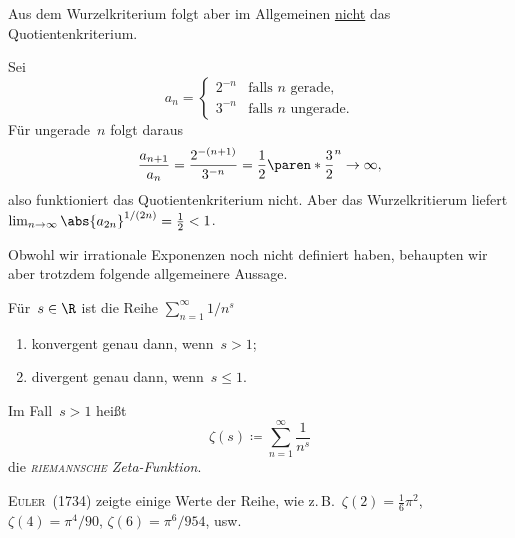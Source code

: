 \documentclass[a4paper]{article}
\begin{document}
Aus dem Wurzelkriterium folgt aber im Allgemeinen \underline{nicht} das Quotientenkriterium.

\begin{example}
    Sei
    \begin{equation*}
        a_n = \begin{cases}
            2^{-n} & \text{falls $n$ gerade},   \\
            3^{-n} & \text{falls $n$ ungerade}.
        \end{cases}
    \end{equation*}
    Für ungerade~$n$ folgt daraus
    \begin{equation*}
        \frac{a_{n+1}}{a_n} = \frac{2^{-(n+1)}}{3^{-n}} = \frac{1}{2} \paren*{\frac{3}{2}}^n \to \infty,
    \end{equation*}
    also funktioniert das Quotientenkriterium nicht. Aber das Wurzelkritierum liefert $\lim_{n\to\infty} \abs{a_{2n}}^{1/(2n)} = \frac{1}{2} < 1$.
\end{example}

Obwohl wir irrationale Exponenzen noch nicht definiert haben, behaupten wir aber trotzdem folgende allgemeinere Aussage.

\begin{theorem}\label{thm:series:riemannzeta}
    Für~$s \in \R$ ist die Reihe $\sum_{n=1}^\infty 1/n^s$
    \begin{enumerate}
        \item konvergent genau dann, wenn~$s > 1$;
        \item divergent genau dann, wenn~$s \leq 1$.
    \end{enumerate}
\end{theorem}

\begin{notation}
    Im Fall~$s > 1$ heißt
    \begin{equation*}
        \zeta(s) \coloneqq \sum_{n=1}^\infty \frac{1}{n^s}
    \end{equation*}
    die \emph{\textsc{riemannsche} Zeta-Funktion}.
\end{notation}

\textsc{Euler}~(1734) zeigte einige Werte der Reihe, wie z.\,B.\ $\zeta(2) = \frac{1}{6} \pi^2$, $\zeta(4) = \pi^4/90$, $\zeta(6) = \pi^6/954$, usw.
\end{document}
